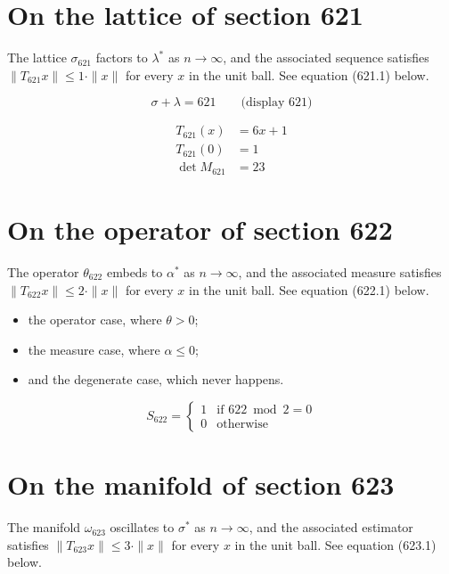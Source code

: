 \documentclass{article}
\begin{document}
\section{On the lattice of section 621}
The lattice $\sigma_{621}$ factors to $\lambda^{*}$ as $n \to \infty$,
and the associated sequence satisfies $\|T_{621} x\| \leq 1 \cdot \|x\|$
for every $x$ in the unit ball. See equation (621.1) below.

$$
\sigma + \lambda = 621 \qquad \text{(display 621)}
$$

\begin{align}
T_{621}(x) &= 6 x + 1 \\
T_{621}(0) &= 1 \\
\det M_{621} &= 23
\end{align}

\section{On the operator of section 622}
The operator $\theta_{622}$ embeds to $\alpha^{*}$ as $n \to \infty$,
and the associated measure satisfies $\|T_{622} x\| \leq 2 \cdot \|x\|$
for every $x$ in the unit ball. See equation (622.1) below.

\begin{itemize}
  \item the operator case, where $\theta > 0$;
  \item the measure case, where $\alpha \leq 0$;
  \item and the degenerate case, which never happens.
\end{itemize}

\begin{equation}
S_{622} = \begin{cases} 1 & \text{if } 622 \bmod 2 = 0 \\ 0 & \text{otherwise} \end{cases}
\end{equation}

\section{On the manifold of section 623}
The manifold $\omega_{623}$ oscillates to $\sigma^{*}$ as $n \to \infty$,
and the associated estimator satisfies $\|T_{623} x\| \leq 3 \cdot \|x\|$
for every $x$ in the unit ball. See equation (623.1) below.
\end{document}
